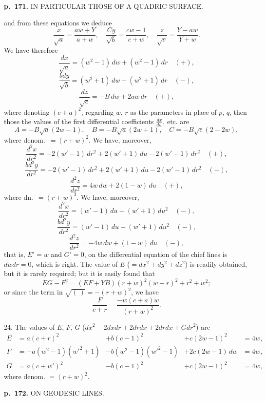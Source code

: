 \documentclass[11pt,a4paper]{book}
\begin{document}
\clearpage

\noindent
\textbf{p.~171.}  IN PARTICULAR THOSE OF A QUADRIC SURFACE.

and from these equations we deduce
\[
\frac{x}{\sqrt{a}} = \frac{aw + Y}{a + w}, \quad \frac{Cy}{\sqrt{b}} = \frac{cw - 1}{c + w}, \quad \frac{z}{\sqrt{c}} = \frac{Y - aw}{Y + w}.
\]
We have therefore
\[
\frac{dx}{\sqrt{a}} = (w^2 - 1)\, dw + (w^2 - 1)\, dr \quad (+),
\]
\[
\frac{bdy}{\sqrt{b}} = (w^2 + 1)\, dw + (w^2 + 1)\, dr \quad (-),
\]
\[
\frac{dz}{\sqrt{c}} = -B\, dw + 2aw \, dr \quad (+),
\]
where denoting $(c + a)^2$, regarding $w$, $r$ as the parameters in place of $p$, $q$, then those the values of the first differential coefficients $\frac{dx}{dw}$, etc. are
\[
A = -B\sqrt{a}\left(2w - 1\right), \quad B = -B\sqrt{a}\left(2w + 1\right), \quad C = -B\sqrt{c}\left(2 - 2w\right),
\]
where denom.\ $=(r + w)^2$.  We have, moreover,
\[
\frac{d^2 x}{dr^2} = -2(w' - 1)\, dr^2 + 2(w' + 1)\, du - 2(w' - 1)\, dr^2 \quad (+),
\]
\[
\frac{bd^2 y}{dr^2} = -2(w' - 1)\, dr^2 + 2(w' + 1)\, du - 2(w' - 1)\, dr^2 \quad (-),
\]
\[
\frac{d^2 z}{dr^2} = 4w \, dw + 2(1 - w)\, du \quad (+),
\]
where dn.\ $=(r + w)^3$.  We have, moreover,
\[
\frac{d^2 x}{dr^2} = (w' - 1)\, du - (w' + 1)\, du^2 \quad (-),
\]
\[
\frac{bd^2 y}{dr^2} = (w' - 1)\, du - (w' + 1)\, du^2 \quad (-),
\]
\[
\frac{d^2 z}{dr^2} = -4w\, dw + (1 - w)\, du \quad (-),
\]
that is, $E' = w$ and $G' = 0$, on the differential equation of the chief lines is $dw dr = 0$,
which is right.  The value of $E$ ($= dx^2 + dy^2 + dz^2$) is readily obtained, but it is rarely required; but it is easily found that
\[
EG - F^2 = (E F + Y B)(r + w)^2 (w + r)^2 + r^2 + w^2;
\]
or since the term in $\sqrt{(\ )} = -(r + w)^2$, we have
\[
\frac{F}{c+r} = \frac{-w(c + a)w}{(r + w)^2}.
\]

24. The values of $E$, $F$, $G$ ($dx^2 - 2dx dr + 2dr dx + 2dr dx + Gdr^2$) are
\begin{align*}
E &= a(c+r)^2  &+ b(c-1)^2  &+ c(2w-1)^2  &= 4w,\\
F &= -a(w^2 - 1)(w'^2 + 1) &- b(w^2 - 1)(w'^2 - 1) &+ 2c(2w - 1)\,dw  &= 4w,\\
G &= a(c+w')^2  &- b(c-1)^2  &+ c(2w-1)^2  &= 4w,
\end{align*}
where denom. $=(r + w)^2$.

\clearpage

\noindent
\textbf{p.~172.}  ON GEODESIC LINES.
\end{document}
